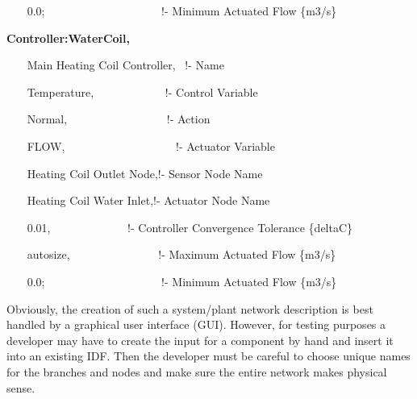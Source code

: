 ~~~ 0.0;~~~~~~~~~~~~~~~~~~~~ !- Minimum Actuated Flow \{m3/s\}

\textbf{Controller:WaterCoil,}

~~~ Main Heating Coil Controller,~ !- Name

~~~ Temperature,~~~~~~~~~~~~ !- Control Variable

~~~ Normal,~~~~~~~~~~~~~~~~~ !- Action

~~~ FLOW,~~~~~~~~~~~~~~~~~~~ !- Actuator Variable

~~~ Heating Coil Outlet Node,!- Sensor Node Name

~~~ Heating Coil Water Inlet,!- Actuator Node Name

~~~ 0.01,~~~~~~~~~~~~~ !- Controller Convergence Tolerance \{deltaC\}

~~~ autosize,~~~~~~~~~~~~~~~ !- Maximum Actuated Flow \{m3/s\}

~~~ 0.0;~~~~~~~~~~~~~~~~~~~~ !- Minimum Actuated Flow \{m3/s\}

Obviously, the creation of such a system/plant network description is best handled by a graphical user interface (GUI). However, for testing purposes a developer may have to create the input for a component by hand and insert it into an existing IDF. Then the developer must be careful to choose unique names for the branches and nodes and make sure the entire network makes physical sense.
